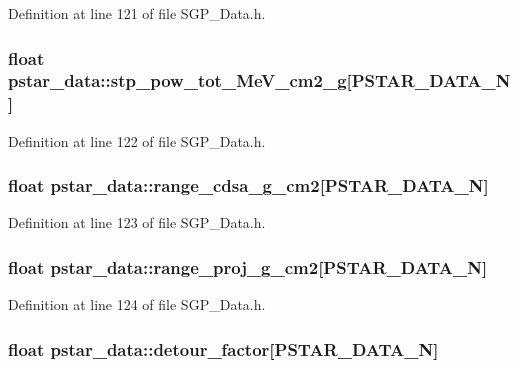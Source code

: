 Definition at line 121 of file SGP\_\-Data.h.\hypertarget{structpstar__data_8875c1eb48825aebf860e42e8d9113f7}{
\subsubsection[stp\_\-pow\_\-tot\_\-MeV\_\-cm2\_\-g]{\setlength{\rightskip}{0pt plus 5cm}float {\bf pstar\_\-data::stp\_\-pow\_\-tot\_\-MeV\_\-cm2\_\-g}\mbox{[}PSTAR\_\-DATA\_\-N\mbox{]}}}
\label{df/d58/structpstar__data_8875c1eb48825aebf860e42e8d9113f7}




Definition at line 122 of file SGP\_\-Data.h.\hypertarget{structpstar__data_1a97d8bf7fb77c6a1ddeac3792fdaeb3}{
\subsubsection[range\_\-cdsa\_\-g\_\-cm2]{\setlength{\rightskip}{0pt plus 5cm}float {\bf pstar\_\-data::range\_\-cdsa\_\-g\_\-cm2}\mbox{[}PSTAR\_\-DATA\_\-N\mbox{]}}}
\label{df/d58/structpstar__data_1a97d8bf7fb77c6a1ddeac3792fdaeb3}




Definition at line 123 of file SGP\_\-Data.h.\hypertarget{structpstar__data_1591a6c0b3797ad8481bccb22e2a741a}{
\subsubsection[range\_\-proj\_\-g\_\-cm2]{\setlength{\rightskip}{0pt plus 5cm}float {\bf pstar\_\-data::range\_\-proj\_\-g\_\-cm2}\mbox{[}PSTAR\_\-DATA\_\-N\mbox{]}}}
\label{df/d58/structpstar__data_1591a6c0b3797ad8481bccb22e2a741a}




Definition at line 124 of file SGP\_\-Data.h.\hypertarget{structpstar__data_0ec83a1b0c2d1f5e24a8af5454f4e339}{
\subsubsection[detour\_\-factor]{\setlength{\rightskip}{0pt plus 5cm}float {\bf pstar\_\-data::detour\_\-factor}\mbox{[}PSTAR\_\-DATA\_\-N\mbox{]}}}
\label{df/d58/structpstar__data_0ec83a1b0c2d1f5e24a8af5454f4e339}




